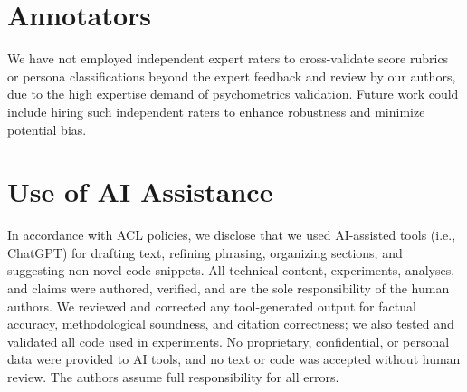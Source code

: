 \documentclass[11pt]{article}
\begin{document}
\section{Annotators}
\label{app:use_of_annotators}
We have not employed independent expert raters to cross-validate score rubrics or persona classifications beyond the expert feedback and review by our authors, due to the high expertise demand of psychometrics validation. Future work could include hiring such independent raters to enhance robustness and minimize potential bias.

\section{Use of AI Assistance}
\label{app:use_of_ai}
In accordance with ACL policies, we disclose that we used AI-assisted tools (i.e., ChatGPT) for drafting text, refining phrasing, organizing sections, and suggesting non-novel code snippets. All technical content, experiments, analyses, and claims were authored, verified, and are the sole responsibility of the human authors. We reviewed and corrected any tool-generated output for factual accuracy, methodological soundness, and citation correctness; we also tested and validated all code used in experiments. No proprietary, confidential, or personal data were provided to AI tools, and no text or code was accepted without human review. The authors assume full responsibility for all errors.
\end{document}
